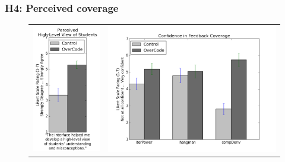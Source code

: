 \subsubsection{H4: Perceived coverage}

\begin{figure}[t!]
\begin{tabular}{c | c}
\begin{minipage}{.5\linewidth}
\centering
\includegraphics[scale=0.5]{Body/figures/overcode/highLevelViewStudy2.png}
\end{minipage}
&
\begin{minipage}{.5\linewidth}
\centering
\includegraphics[width=\linewidth]{Body/figures/overcode/coverageConfidence.png}

\end{minipage}
\end{tabular}
\end{figure}
